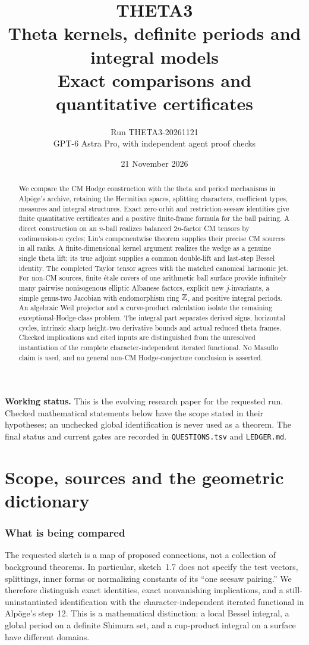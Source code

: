 \documentclass[11pt]{article}
\title{THETA3\\Theta kernels, definite periods and integral models\\\large Exact comparisons and quantitative certificates}
\author{Run THETA3-20261121\\GPT-6 Astra Pro, with independent agent proof checks}
\date{21 November 2026}
\theoremstyle{definition}\newtheorem{definition}[theorem]{Definition}\newtheorem{remark}[theorem]{Remark}
\begin{document}
\maketitle
\begin{abstract}
We compare the CM Hodge construction with the theta and period mechanisms in Alp\"oge's archive, retaining the Hermitian spaces, splitting characters, coefficient types, measures and integral structures. Exact zero-orbit and restriction-seesaw identities give finite quantitative certificates and a positive finite-frame formula for the ball pairing. A direct construction on an $n$-ball realizes balanced $2n$-factor CM tensors by codimension-$n$ cycles; Liu's componentwise theorem supplies their precise CM sources in all ranks. A finite-dimensional kernel argument realizes the wedge as a genuine single theta lift; its true adjoint supplies a common double-lift and last-step Bessel identity. The completed Taylor tensor agrees with the matched canonical harmonic jet. For non-CM sources, finite \'etale covers of one arithmetic ball surface provide infinitely many pairwise nonisogenous elliptic Albanese factors, explicit new $j$-invariants, a simple genus-two Jacobian with endomorphism ring $\mathbb Z$, and positive integral periods. An algebraic Weil projector and a curve-product calculation isolate the remaining exceptional-Hodge-class problem. The integral part separates derived signs, horizontal cycles, intrinsic sharp height-two derivative bounds and actual reduced theta frames. Checked implications and cited inputs are distinguished from the unresolved instantiation of the complete character-independent iterated functional. No Masullo claim is used, and no general non-CM Hodge-conjecture conclusion is asserted.
\end{abstract}
\noindent\textbf{Working status.} This is the evolving research paper for the requested run. Checked mathematical statements below have the scope stated in their hypotheses; an unchecked global identification is never used as a theorem. The final status and current gates are recorded in \texttt{QUESTIONS.tsv} and \texttt{LEDGER.md}.

\tableofcontents\clearpage
\part{Scope, sources and the geometric dictionary}
\section{What is being compared}
The requested sketch is a map of proposed connections, not a collection of background theorems. In particular, sketch~1.7 does not specify the test vectors, splittings, inner forms or normalizing constants of its ``one seesaw pairing.'' We therefore distinguish exact identities, exact nonvanishing implications, and a still-uninstantiated identification with the character-independent iterated functional in Alp\"oge's step~12. This is a mathematical distinction: a local Bessel integral, a global period on a definite Shimura set, and a cup-product integral on a surface have different domains.
\end{document}

